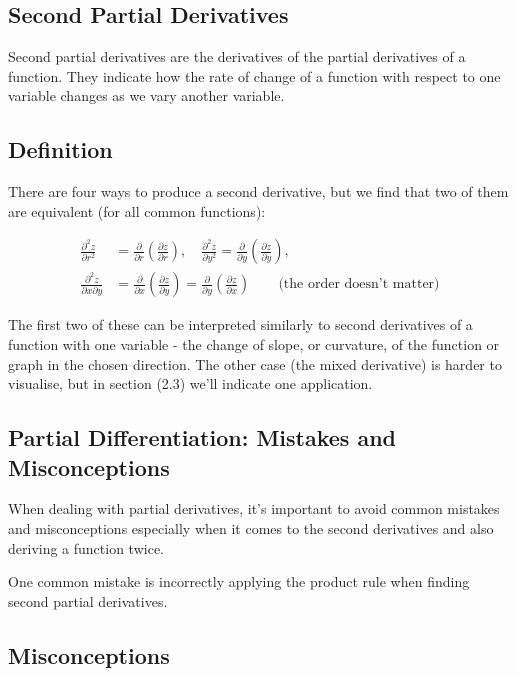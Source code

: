 \documentclass[a4paper,12pt]{article}
\begin{document}
\subsection*{Second Partial Derivatives}

Second partial derivatives are the derivatives of the partial derivatives of a function. They indicate how the rate of change of a function with respect to one variable changes as we vary another variable.
\subsection{Definition}

There are four ways to produce a second derivative, but we find that two of them are equivalent
(for all common functions):

\begin{align}
\frac{\partial^2 z}{\partial r^2} &= \frac{\partial}{\partial r}\left(\frac{\partial z}{\partial r}\right), \quad \frac{\partial^2 z}{\partial y^2} = \frac{\partial}{\partial y}\left(\frac{\partial z}{\partial y}\right), \tag{1} \\
\frac{\partial^2 z}{\partial x\partial y} &= \frac{\partial}{\partial x}\left(\frac{\partial z}{\partial y}\right) = \frac{\partial}{\partial y}\left(\frac{\partial z}{\partial x}\right) \qquad \text{(the order doesn't matter)} \tag{2}
\end{align}

The first two of these can be interpreted similarly to second derivatives of a function with one
variable - the change of slope, or curvature, of the function or graph in the chosen direction.
The other case (the mixed derivative) is harder to visualise, but in section (2.3) we'll indicate
one application.

\subsection*{Partial Differentiation: Mistakes and Misconceptions}

When dealing with partial derivatives, it's important to avoid common mistakes and misconceptions especially when it comes to the second derivatives and also deriving a function twice.

One common mistake is incorrectly applying the product rule when finding second partial derivatives.

\subsection*{Misconceptions}
\end{document}
